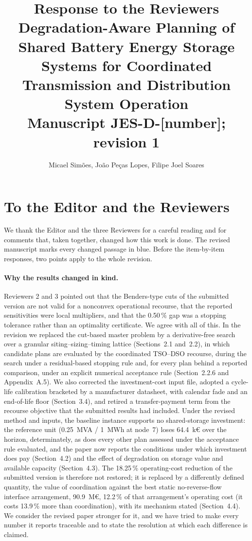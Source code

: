 \documentclass[11pt]{article}
\title{Response to the Reviewers\\
\large Degradation-Aware Planning of Shared Battery Energy Storage Systems for Coordinated Transmission and Distribution System Operation\\
\normalsize Manuscript JES-D-[number]; revision 1}
\author{Micael Sim\~oes, Jo\~ao Pe\c{c}as Lopes, Filipe Joel Soares}
\date{}
\begin{document}
\maketitle

\section*{To the Editor and the Reviewers}

We thank the Editor and the three Reviewers for a careful reading and for comments that, taken
together, changed how this work is done. The revised manuscript marks every changed passage in blue.
Before the item-by-item responses, two points apply to the whole revision.

\paragraph{Why the results changed in kind.}
Reviewers 2 and 3 pointed out that the Benders-type cuts of the submitted version are not valid for a
nonconvex operational recourse, that the reported sensitivities were local multipliers, and that the
0.50\,\% gap was a stopping tolerance rather than an optimality certificate. We agree with all of this. In
the revision we replaced the cut-based master problem by a derivative-free search over a granular
siting--sizing--timing lattice (Sections~2.1 and~2.2), in which candidate plans are evaluated by the
coordinated TSO--DSO recourse, during the search under a residual-based stopping rule and, for every plan behind a reported comparison, under an explicit numerical acceptance rule (Section~2.2.6 and
Appendix~A.5). We also corrected the investment-cost input file, adopted a
cycle-life calibration bracketed by a manufacturer datasheet, with calendar fade and an end-of-life floor (Section~3.4), and
retired a transfer-payment term from the recourse objective that the submitted results had included. Under
the revised method and inputs, the baseline instance supports no shared-storage investment: the reference
unit (0.25~MVA / 1~MWh at node~7) loses 64.4~k\euro{} over the horizon, determinately, as does every other plan assessed under the acceptance rule
evaluated, and the paper now reports the
conditions under which investment does pay (Section~4.2) and the effect of degradation on storage value and available capacity
(Section~4.3). The 18.25\,\% operating-cost reduction of the submitted version is therefore not restored;
it is replaced by a differently defined quantity, the value of coordination against the best static
no-reverse-flow interface arrangement, 90.9~M\euro{}, 12.2\,\% of that arrangement's operating cost (it costs 13.9\,\% more than coordination), with its mechanism stated
(Section~4.4). We consider the revised paper stronger for it, and we have tried to make every number it
reports traceable and to state the resolution at which each difference is claimed.
\end{document}
